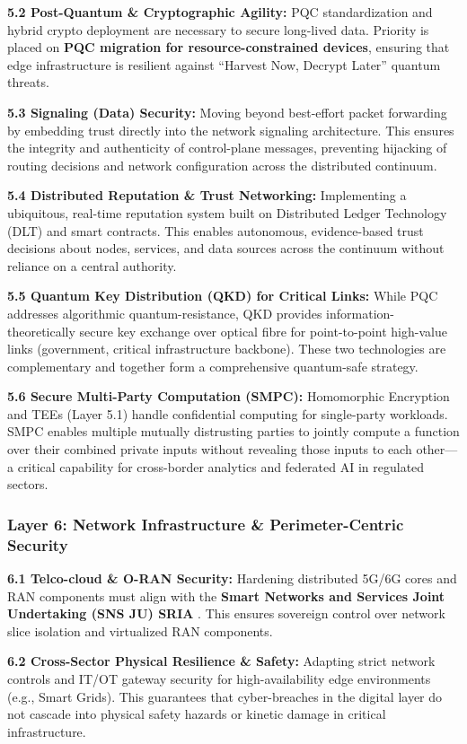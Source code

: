 \documentclass[12pt,a4paper]{article}
\begin{document}
\textbf{5.2 Post-Quantum \& Cryptographic Agility:} PQC standardization and hybrid crypto deployment are necessary to secure long-lived data. Priority is placed on \textbf{PQC migration for resource-constrained devices}, ensuring that edge infrastructure is resilient against ``Harvest Now, Decrypt Later'' quantum threats.

\textbf{5.3 Signaling (Data) Security:} Moving beyond best-effort packet forwarding by embedding trust directly into the network signaling architecture. This ensures the integrity and authenticity of control-plane messages, preventing hijacking of routing decisions and network configuration across the distributed continuum.

\textbf{5.4 Distributed Reputation \& Trust Networking:} Implementing a ubiquitous, real-time reputation system built on Distributed Ledger Technology (DLT) and smart contracts. This enables autonomous, evidence-based trust decisions about nodes, services, and data sources across the continuum without reliance on a central authority.

\textbf{5.5 Quantum Key Distribution (QKD) for Critical Links:} While PQC addresses algorithmic quantum-resistance, QKD provides information-theoretically secure key exchange over optical fibre for point-to-point high-value links (government, critical infrastructure backbone). These two technologies are complementary and together form a comprehensive quantum-safe strategy.

\textbf{5.6 Secure Multi-Party Computation (SMPC):} Homomorphic Encryption and TEEs (Layer 5.1) handle confidential computing for single-party workloads. SMPC enables multiple mutually distrusting parties to jointly compute a function over their combined private inputs without revealing those inputs to each other---a critical capability for cross-border analytics and federated AI in regulated sectors.

\subsubsection*{Layer 6: Network Infrastructure \& Perimeter-Centric Security}
\textbf{6.1 Telco-cloud \& O-RAN Security:} Hardening distributed 5G/6G cores and RAN components must align with the \textbf{Smart Networks and Services Joint Undertaking (SNS JU) SRIA} \cite{snsju}. This ensures sovereign control over network slice isolation and virtualized RAN components.

\textbf{6.2 Cross-Sector Physical Resilience \& Safety:} Adapting strict network controls and IT/OT gateway security for high-availability edge environments (e.g., Smart Grids). This guarantees that cyber-breaches in the digital layer do not cascade into physical safety hazards or kinetic damage in critical infrastructure.
\end{document}
